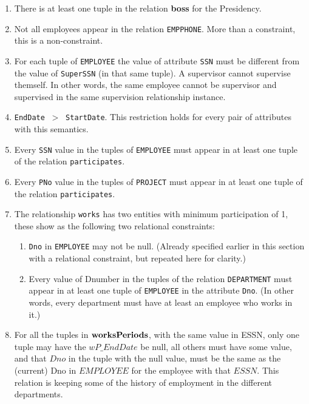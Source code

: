 \documentclass[11pt]{article}
\begin{document}
\begin{enumerate}
\item There is at least one tuple in the relation {\bf boss} for the Presidency.
\item Not all employees appear in the relation \verb|EMPPHONE|. More than a constraint, this is a non-constraint.
\item For each tuple of \verb|EMPLOYEE| the value of attribute \verb|SSN| must be different from the value of \verb|SuperSSN| (in that same tuple). 
A supervisor cannot supervise themself. In other words, the same employee cannot be supervisor and supervised in the same supervision relationship instance.
\item \verb|EndDate| $~>~$ \verb|StartDate|. This restriction holds for every pair of attributes with this semantics.
\item Every \verb|SSN| value in the tuples of  \verb|EMPLOYEE| must appear in at least one tuple of the relation 
\verb|participates|.
\item Every \verb|PNo| value in the tuples of \verb|PROJECT| must appear in at least one tuple of the relation 
\verb|participates|.
\item The relationship \verb|works| has two entities with minimum participation of 1, these show as the following two relational constraints:
\begin{enumerate}
\item \verb|Dno| in \verb|EMPLOYEE| may not be null. (Already specified earlier in this section with a relational constraint, but repeated here for clarity.)
\item Every value of Dnumber in the tuples of the relation \verb|DEPARTMENT| must appear in at least one tuple of 
\verb|EMPLOYEE| in the attribute \verb|Dno|. (In other words, every department must have at least an employee who works in it.)
\end{enumerate}
\item For all the tuples in ${\bf worksPeriods}$, with the same value in ESSN, only one tuple may have the $wP\_EndDate$ be null, all others must have some value, and that $Dno$ in the tuple with the null value, must be the same as the (current) Dno in $EMPLOYEE$ for the employee with that $ESSN$. This relation is keeping some of the history of employment in the different departments.

\end{enumerate}
\end{document}
